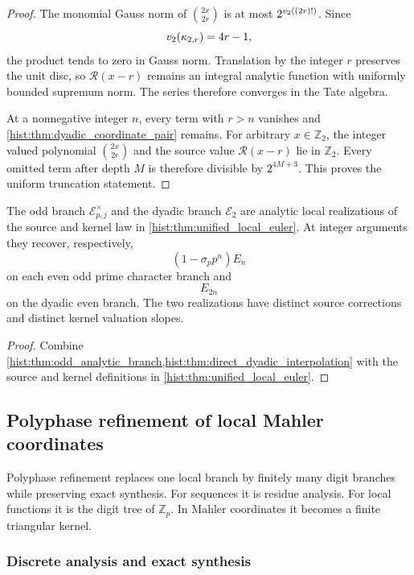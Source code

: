 \begin{proof}
The monomial Gauss norm of \(\binom{2x}{2r}\) is at most \(2^{v_2((2r)!)}\). Since
\[
v_2(\kappa_{2,r})=4r-1,
\]
the product tends to zero in Gauss norm. Translation by the integer \(r\) preserves the unit disc, so \(\mathscr R(x-r)\) remains an integral analytic function with uniformly bounded supremum norm. The series therefore converges in the Tate algebra.

At a nonnegative integer \(n\), every term with \(r>n\) vanishes and \cref{hist:thm:dyadic_coordinate_pair} remains. For arbitrary \(x\in\mathbb Z_2\), the integer valued polynomial \(\binom{2x}{2r}\) and the source value \(\mathscr R(x-r)\) lie in \(\mathbb Z_2\). Every omitted term after depth \(M\) is therefore divisible by \(2^{4M+3}\). This proves the uniform truncation statement.
\end{proof}

\begin{histtheorem}\label{hist:thm:unified_local_interpolation}
The odd branch \(\mathscr E_{p,j}^\times\) and the dyadic branch \(\mathscr E_2\) are analytic local realizations of the source and kernel law in \cref{hist:thm:unified_local_euler}. At integer arguments they recover, respectively,
\[
\left(1-\sigma_pp^n\right)E_n
\]
on each even odd prime character branch and
\[
E_{2n}
\]
on the dyadic even branch. The two realizations have distinct source corrections and distinct kernel valuation slopes.
\end{histtheorem}

\begin{proof}
Combine \cref{hist:thm:odd_analytic_branch,hist:thm:direct_dyadic_interpolation} with the source and kernel definitions in \cref{hist:thm:unified_local_euler}.
\end{proof}

\subsection{Polyphase refinement of local Mahler coordinates}\label{hist:sec:polyphase}

Polyphase refinement replaces one local branch by finitely many digit branches while preserving exact synthesis. For sequences it is residue analysis. For local functions it is the digit tree of \(\mathbb Z_p\). In Mahler coordinates it becomes a finite triangular kernel.

\subsubsection{Discrete analysis and exact synthesis}

